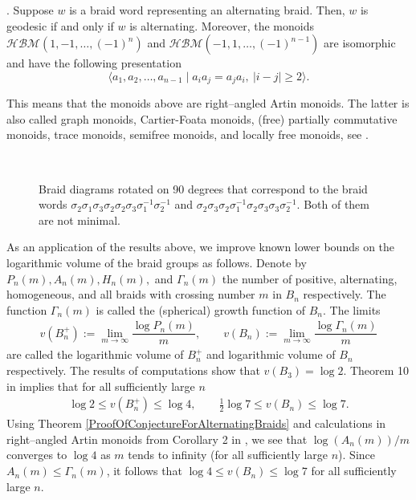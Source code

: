 \documentclass[11pt]{amsart}
\theoremstyle{plain}
\theoremstyle{definition}
\numberwithin{equation}{section}
\begin{document}
. Suppose $w$ is a braid word representing an alternating braid. Then, $w$ is geodesic if and only if $w$ is alternating. Moreover, the monoids $\mathcal{HBM}(1,-1,\ldots,(-1)^n)$ and $\mathcal{HBM}(-1,1,\ldots,(-1)^{n-1})$ are isomorphic and have the following presentation
$$\langle a_1, a_2, \ldots, a_{n-1} \mid a_ia_j=a_ja_i, \ |i-j|\geq 2\rangle.$$

This means that the monoids above are right--angled Artin monoids. The latter is also called graph monoids, Cartier-Foata monoids, (free) partially commutative monoids, trace monoids, semifree monoids, and locally free monoids, see \cite{Charney}.
\begin{figure}[H]
\centering
{} \ \hspace{1cm}
\caption{Braid diagrams rotated on 90 degrees that correspond to the braid words $\sigma_2\sigma_1\sigma_3\sigma_2\sigma_2\sigma_3\sigma_1^{-1}\sigma_2^{-1}$ and $\sigma_2\sigma_3\sigma_2\sigma_1^{-1}\sigma_2\sigma_3\sigma_3\sigma_2^{-1}$. Both of them are not minimal.
}\label{PNotMinimal}
\end{figure}

As an application of the results above, we improve known lower bounds on the logarithmic volume of the braid groups as follows. Denote by $P_n(m), A_n(m), H_n(m),$ and $\Gamma_n(m)$ the number of positive, alternating, homogeneous, and all braids with crossing number $m$ in $B_n$ respectively. The function $\Gamma_n(m)$ is called the (spherical) growth function of $B_n$. The limits 
\begin{align*}
v(B_n^+) := \lim\limits_{m \to \infty} \dfrac{\log P_n(m)}{m}, \qquad v(B_n) := \lim\limits_{m \to \infty} \dfrac{\log \Gamma_n(m)}{m}
\end{align*}
are called the logarithmic volume of $B_n^+$ and logarithmic volume of $B_n$ respectively. The results of computations show that $v(B_3) = \log 2$. Theorem 10 in \cite{Vershik} implies that for all sufficiently large $n$
\begin{align*}
\log 2 \leq v(B_n^+) \leq \log 4, \qquad \frac{1}{2} \log 7 \leq v(B_n) \leq \log 7.
\end{align*}
Using Theorem \ref{ProofOfConjectureForAlternatingBraids} and calculations in right--angled Artin monoids from Corollary 2 in \cite{Vershik}, we see that $\log (A_n(m))/m$ converges to $\log 4$ as $m$ tends to infinity (for all sufficiently large $n$). Since $A_n(m) \leq \Gamma_n(m)$, it follows that $\log 4 \leq v(B_n) \leq \log 7$ for all sufficiently large $n$.
\end{document}
